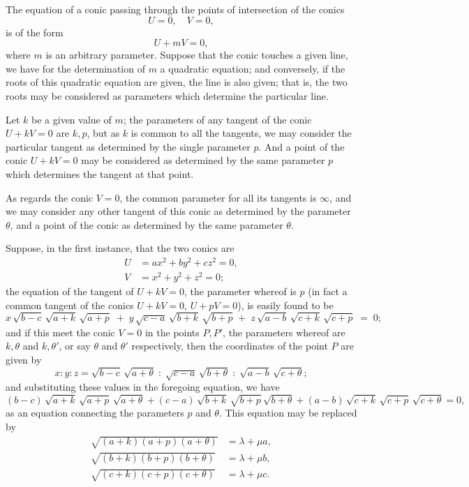 \documentclass[11pt]{article}
\begin{document}
\medskip

\noindent The equation of a conic passing through the points of intersection of the conics
\[
   U = 0,\quad V = 0,
\]
is of the form
\[
   U + m V = 0,
\]
where $m$ is an arbitrary parameter. Suppose that the conic touches a given line, we have for the determination of $m$ a quadratic equation; and conversely, if the roots of this quadratic equation are given, the line is also given; that is, the two roots may be considered as parameters which determine the particular line.

\medskip

\noindent Let $k$ be a given value of $m$; the parameters of any tangent of the conic $U + kV = 0$ are $k, p$, but as $k$ is common to all the tangents, we may consider the particular tangent as determined by the single parameter $p$. And a point of the conic $U + kV = 0$ may be considered as determined by the same parameter $p$ which determines the tangent at that point.

\medskip

\noindent As regards the conic $V = 0$, the common parameter for all its tangents is $\infty$, and we may consider any other tangent of this conic as determined by the parameter $\theta$, and a point of the conic as determined by the same parameter $\theta$.

\medskip

\noindent Suppose, in the first instance, that the two conics are
\[
\begin{aligned}
   U &= a x^2 + b y^2 + c z^2 = 0,\\
   V &= x^2 + y^2 + z^2 = 0;
\end{aligned}
\]
the equation of the tangent of $U + kV = 0$, the parameter whereof is $p$ (in fact a common tangent of the conics $U + kV = 0$, $U + pV = 0$), is easily found to be
\[
   x\,\sqrt{b - c}\,\sqrt{a + k}\,\sqrt{a + p}\;+\;y\,\sqrt{c - a}\,\sqrt{b + k}\,\sqrt{b + p}\;+\;z\,\sqrt{a - b}\,\sqrt{c + k}\,\sqrt{c + p}\;=\;0;
\]
and if this meet the conic $V = 0$ in the points $P, P'$, the parameters whereof are $k, \theta$ and $k, \theta'$, or say $\theta$ and $\theta'$ respectively, then the coordinates of the point $P$ are given by
\[
   x : y : z = \sqrt{b - c}\,\sqrt{a + \theta} \;:\; \sqrt{c - a}\,\sqrt{b + \theta} \;:\; \sqrt{a - b}\,\sqrt{c + \theta};
\]
and substituting these values in the foregoing equation, we have
\[
   (b - c)\,\sqrt{a + k}\,\sqrt{a + p}\,\sqrt{a + \theta} + (c - a)\,\sqrt{b + k}\,\sqrt{b + p}\,\sqrt{b + \theta} + (a - b)\,\sqrt{c + k}\,\sqrt{c + p}\,\sqrt{c + \theta} = 0,
\]
as an equation connecting the parameters $p$ and $\theta$. This equation may be replaced by
\[
\begin{aligned}
   \sqrt{(a + k)(a + p)(a + \theta)} &= \lambda + \mu a,\\
   \sqrt{(b + k)(b + p)(b + \theta)} &= \lambda + \mu b,\\
   \sqrt{(c + k)(c + p)(c + \theta)} &= \lambda + \mu c.
\end{aligned}
\]
\end{document}
